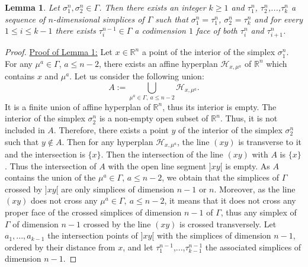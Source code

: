 \documentclass{article}
\newtheorem{lemma}{Lemma}
\begin{document}
\begin{lemma}
    Let $\sigma^n_1,\sigma^n_2 \in \Gamma$. Then there exists an integer $k\geq 1$ and $\tau^n_1$, $\tau^n_2$,...,$\tau^n_k$ a sequence of $n$-dimensional simplices of $\Gamma$ such that $\sigma^n_1 = \tau^n_1$, $\sigma^n_2 = \tau^n_k$ and for every $1 \leq i \leq k-1$ there exists $\tau^{n-1}_i \in \Gamma$ a codimension $1$ face of both $\tau^n_i$ and $\tau^n_{i+1}$.

    \label{ur}
\end{lemma}

\begin{proof}
    \underline{Proof of Lemma \ref{ur}:} 
    Let $x\in\mathbb{R}^n$ a point of the interior of the simplex $\sigma^n_1$. For any $\mu^a \in \Gamma$, $a \leq n-2$, there exists an affine hyperplan $\mathcal{H}_{x,\mu^a}$ of $\mathbb{R}^n$ which contains $x$ and $\mu^a$. Let us consider the following union:
    \begin{equation*}
        A:= \bigcup_{\mu^a \in \Gamma, ~ a\leq n-2}\mathcal{H}_{x,\mu^a}.
    \end{equation*}
    It is a finite union of affine hyperplan of $\mathbb{R}^n$, thus its interior is empty. The interior of the simplex $\sigma^n_2$ is a non-empty open subset of $\mathbb{R}^n$. Thus, it is not included in $A$. Therefore, there exists a point $y$ of the interior of the simplex $\sigma^n_2$ such that $y \notin A$. Then for any hyperplan $\mathcal{H}_{x,\mu^a}$, the line $(xy)$ is transverse to it and the intersection is $\{x\}$. Then the intersection of the line $(xy)$ with $A$ is $\{x\}$. Thus the intersection of $A$ with the open line segment $]xy[$ is empty. As $A$ contains the union of the $\mu^a \in \Gamma$, $a \leq n-2$, we obtain that the simplices of $\Gamma$ crossed by $]xy[$ are only simplices of dimension $n-1$ or $n$. Moreover, as the line $(xy)$ does not cross any $\mu^a \in \Gamma, ~a\leq n-2$, it means that it does not cross any proper face of the crossed simplices of dimension $n-1$ of $\Gamma$, thus any simplex of $\Gamma$ of dimension $n-1$ crossed by the line $(xy)$ is crossed transversely. Let $a_1,...,a_{k-1}$ the intersection points of $]xy[$ with the simplices of dimension $n-1$, ordered by their distance from $x$, and let $\tau_1^{n-1}$,...,$\tau^{n-1}_{k-1}$ the associated simplices of dimension $n-1$.
    

\end{proof}
\end{document}
